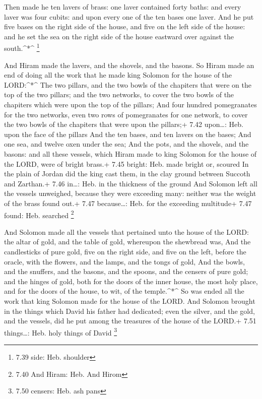  Then made he ten lavers of brass: one laver contained
forty baths: and every laver was four cubits: and upon every one of the
ten bases one laver.  And he put five bases on the right
side of the house, and five on the left side of the house: and he set
the sea on the right side of the house eastward over against the
south.\^{}*\^{} \footnote{7.39 side: Heb. shoulder}

 And Hiram made the lavers, and the shovels, and the
basons. So Hiram made an end of doing all the work that he made king
Solomon for the house of the LORD:\^{}*\^{}  The two
pillars, and the two bowls of the chapiters that were on the top of the
two pillars; and the two networks, to cover the two bowls of the
chapiters which were upon the top of the pillars;  And four
hundred pomegranates for the two networks, even two rows of pomegranates
for one network, to cover the two bowls of the chapiters that were upon
the pillars;+ 7.42 upon\ldots: Heb. upon the face of the pillars
 And the ten bases, and ten lavers on the bases;
 And one sea, and twelve oxen under the sea; 
And the pots, and the shovels, and the basons: and all these vessels,
which Hiram made to king Solomon for the house of the LORD, were of
bright brass.+ 7.45 bright: Heb. made bright or, scoured 
In the plain of Jordan did the king cast them, in the clay ground
between Succoth and Zarthan.+ 7.46 in\ldots: Heb. in the thickness of
the ground  And Solomon left all the vessels unweighed,
because they were exceeding many: neither was the weight of the brass
found out.+ 7.47 because\ldots: Heb. for the exceeding multitude+ 7.47
found: Heb. searched \footnote{7.40 And Hiram: Heb. And Hirom}

 And Solomon made all the vessels that pertained unto the
house of the LORD: the altar of gold, and the table of gold, whereupon
the shewbread was,  And the candlesticks of pure gold, five
on the right side, and five on the left, before the oracle, with the
flowers, and the lamps, and the tongs of gold,  And the
bowls, and the snuffers, and the basons, and the spoons, and the censers
of pure gold; and the hinges of gold, both for the doors of the inner
house, the most holy place, and for the doors of the house, to wit, of
the temple.\^{}*\^{}  So was ended all the work that king
Solomon made for the house of the LORD. And Solomon brought in the
things which David his father had dedicated; even the silver, and the
gold, and the vessels, did he put among the treasures of the house of
the LORD.+ 7.51 things\ldots: Heb. holy things of David \footnote{7.50
  censers: Heb. ash pans}

